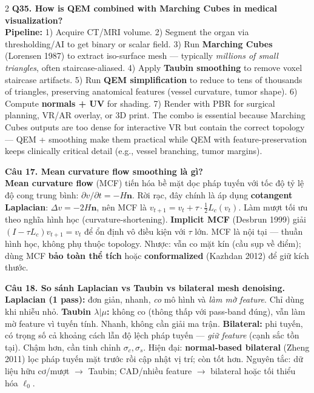 \begin{paracol}{2}
\textbf{Q35. How is QEM combined with Marching Cubes in medical visualization?}\\
\textbf{Pipeline:} 1) Acquire CT/MRI volume. 2) Segment the organ via thresholding/AI to get binary or scalar field. 3) Run \textbf{Marching Cubes} (Lorensen 1987) to extract iso-surface mesh — typically \textit{millions of small triangles}, often staircase-aliased. 4) Apply \textbf{Taubin smoothing} to remove voxel staircase artifacts. 5) Run \textbf{QEM simplification} to reduce to tens of thousands of triangles, preserving anatomical features (vessel curvature, tumor shape). 6) Compute \textbf{normals + UV} for shading. 7) Render with PBR for surgical planning, VR/AR overlay, or 3D print. The combo is essential because Marching Cubes outputs are too dense for interactive VR but contain the correct topology — QEM + smoothing make them practical while QEM with feature-preservation keeps clinically critical detail (e.g., vessel branching, tumor margins).

\switchcolumn

\textbf{Câu 17. Mean curvature flow smoothing là gì?}\\
\textbf{Mean curvature flow} (MCF) tiến hóa bề mặt dọc pháp tuyến với tốc độ tỷ lệ độ cong trung bình: $\partial v/\partial t=-H\mathbf{n}$. Rời rạc, đây chính là áp dụng \textbf{cotangent Laplacian}: $\Delta v=-2H\mathbf{n}$, nên MCF là $v_{t+1}=v_t+\tau\cdot\tfrac{1}{2}L_c(v_t)$. Làm mượt tối ưu theo nghĩa hình học (curvature-shortening). \textbf{Implicit MCF} (Desbrun 1999) giải $(I-\tau L_c)v_{t+1}=v_t$ để ổn định vô điều kiện với $\tau$ lớn. MCF là nội tại — thuần hình học, không phụ thuộc topology. Nhược: vẫn co mặt kín (cầu sụp về điểm); dùng MCF \textbf{bảo toàn thể tích} hoặc \textbf{conformalized} (Kazhdan 2012) để giữ kích thước.

\textbf{Câu 18. So sánh Laplacian vs Taubin vs bilateral mesh denoising.}\\
\textbf{Laplacian (1 pass):} đơn giản, nhanh, \textit{co} mô hình và \textit{làm mờ feature}. Chỉ dùng khi nhiễu nhỏ. \textbf{Taubin $\lambda|\mu$:} không co (thông thấp với pass-band đúng), vẫn làm mờ feature vì tuyến tính. Nhanh, không cần giải ma trận. \textbf{Bilateral:} phi tuyến, có trọng số cả khoảng cách lẫn độ lệch pháp tuyến — \textit{giữ feature} (cạnh sắc tồn tại). Chậm hơn, cần tinh chỉnh $\sigma_c,\sigma_s$. Hiện đại: \textbf{normal-based bilateral} (Zheng 2011) lọc pháp tuyến mặt trước rồi cập nhật vị trí; còn tốt hơn. Nguyên tắc: dữ liệu hữu cơ/mượt $\to$ Taubin; CAD/nhiều feature $\to$ bilateral hoặc tối thiểu hóa $\ell_0$.


\end{paracol}

